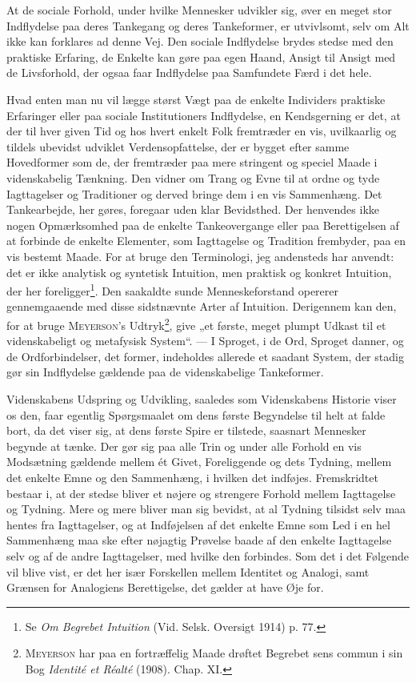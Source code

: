 \documentclass[12pt]{article}
\newcommand{\opage}[1]{\marginnote{\footnotesize\textit{[#1]}}}
\begin{document}
At de sociale Forhold, under hvilke Mennesker udvikler sig, øver en meget stor
Indflydelse paa deres Tankegang og deres Tankeformer, er utvivlsomt, selv om
Alt ikke kan forklares ad denne Vej. Den sociale Indflydelse brydes stedse med
den praktiske Erfaring, de Enkelte kan gøre paa egen Haand, Ansigt til Ansigt
med de Livsforhold, der ogsaa faar Indflydelse paa
Samfundete Færd i det hele.

Hvad enten man nu vil lægge størst Vægt paa de enkelte Individers praktiske
Erfaringer eller paa sociale Institutioners Indflydelse, en Kendsgerning er
det, at der til hver given Tid og hos hvert enkelt Folk fremtræder en vis,
uvilkaarlig og tildels ubevidst udviklet Verdensopfattelse, der er bygget efter
samme Hovedformer som de, der fremtræder paa mere stringent og speciel Maade i
videnskabelig Tænkning. Den vidner om Trang og Evne til at ordne og tyde
Iagttagelser og Traditioner og derved bringe dem i en vis Sammenhæng. Det
Tankearbejde, her gøres, foregaar uden klar Bevidsthed. Der henvendes ikke
nogen Opmærksomhed paa de enkelte Tankeovergange eller paa Berettigelsen af at
forbinde de enkelte Elementer, som Iagttagelse og Tradition frembyder, paa en
vis bestemt Maade. For at bruge den Terminologi, jeg andensteds har anvendt:
det er ikke analytisk og syntetisk Intuition, men praktisk og konkret
Intuition, der her foreligger\footnote{Se \textit{Om Begrebet Intuition} (Vid.
Selsk. Oversigt 1914) p. 77.}. Den saakaldte sunde Menneskeforstand opererer
gennemgaaende med disse sidstnævnte Arter af Intuition. Derigennem kan den, for
at bruge \textsc{Meyerson}'s Udtryk\footnote{\textsc{Meyerson} har paa en
fortræffelig Maade drøftet Begrebet sens commun i sin Bog \textit{Identité et
Réalté} (1908). Chap. XI.}, give „et første, meget plumpt Udkast til et
videnskabeligt og metafysisk System“. --- I Sproget, i de Ord, Sproget danner,
og de Ordforbindelser, det former, indeholdes allerede et saadant System, der
stadig gør sin Indflydelse gældende paa de videnskabelige Tankeformer.

\opage{6}Videnskabens Udspring og Udvikling, saaledes som Videnskabens Historie
viser os den, faar egentlig Spørgsmaalet om dens første Begyndelse til helt at
falde bort, da det viser sig, at dens første Spire er tilstede, saasnart
Mennesker begynde at tænke. Der gør sig paa alle Trin og under alle Forhold en
vis Modsætning gældende mellem ét Givet, Foreliggende og dets Tydning, mellem
det enkelte Emne og den Sammenhæng, i hvilken det indføjes. Fremskridtet
bestaar i, at der stedse bliver et nøjere og strengere Forhold mellem
Iagttagelse og Tydning. Mere og mere bliver man sig bevidst, at al Tydning
tilsidst selv maa hentes fra Iagttagelser, og at Indføjelsen af det enkelte
Emne som Led i en hel Sammenhæng maa ske efter nøjagtig Prøvelse baade af den
enkelte Iagttagelse selv og af de andre Iagttagelser, med hvilke den forbindes.
Som det i det Følgende vil blive vist, er det her især Forskellen mellem
Identitet og Analogi, samt Grænsen for Analogiens Berettigelse, det gælder at
have Øje for.
\end{document}

